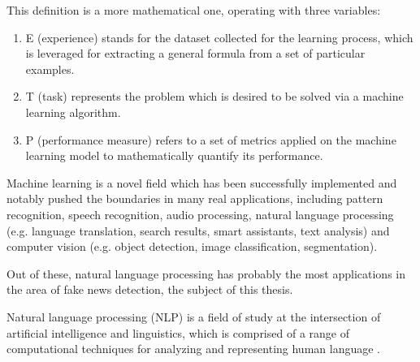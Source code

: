 This definition is a more mathematical one, operating with three variables:
\begin{enumerate}
  \item E (experience) stands for the dataset collected for the learning process, which is leveraged for extracting a general formula from a set of particular examples.
  \item T (task) represents the problem which is desired to be solved via a machine learning algorithm.
  \item P (performance measure) refers to a set of metrics applied on the machine learning model to mathematically quantify its performance.    
\end{enumerate}

Machine learning is a novel field which has been successfully implemented and notably pushed the boundaries in many real applications, including pattern recognition, speech recognition, audio processing, natural language processing (e.g. language translation, search results, smart assistants, text analysis) and computer vision (e.g. object detection, image classification, segmentation).

Out of these, natural language processing has probably the most applications in the area of fake news detection, the subject of this thesis.

\begin{definition}
  Natural language processing (NLP) is a field of study at the intersection of artificial intelligence and linguistics, which is comprised of a range of computational techniques for analyzing and representing human language \cite{a8}.
\end{definition}



